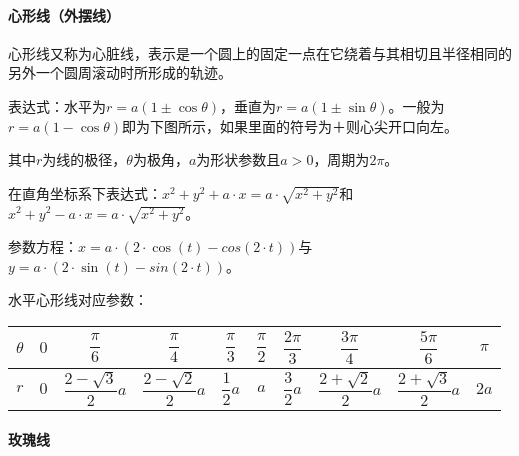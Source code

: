 \documentclass[UTF8, 12pt]{ctexart}
\begin{document}
\paragraph{心形线（外摆线）} \leavevmode \medskip

\begin{minipage}{0.55\linewidth}
    心形线又称为心脏线，表示是一个圆上的固定一点在它绕着与其相切且半径相同的另外一个圆周滚动时所形成的轨迹。

    表达式：水平为$r=a(1\pm\cos\theta)$，垂直为$r=a(1\pm\sin\theta)$。一般为$r=a(1-\cos\theta)$即为下图所示，如果里面的符号为＋则心尖开口向左。

    其中$r$为线的极径，$\theta$为极角，$a$为形状参数且$a>0$，周期为$2\pi$。
\end{minipage}
\hfill
\begin{minipage}{0.35\linewidth}
\end{minipage}

在直角坐标系下表达式：$x^2+y^2+a\cdot x=a\cdot\sqrt{x^2+y^2}$和$x^2+y^2-a\cdot x=a\cdot\sqrt{x^2+y^2}$。

参数方程：$x=a\cdot(2\cdot\cos(t)-cos(2\cdot t))$与$y=a\cdot(2\cdot\sin(t)-sin(2\cdot t))$。

水平心形线对应参数： \leavevmode \medskip

\begin{tabular}{|c|c|c|c|c|c|c|c|c|c|}
    \hline
    $\theta$ & $0$ & $\dfrac{\pi}{6}$         & $\dfrac{\pi}{4}$         & $\dfrac{\pi}{3}$ & $\dfrac{\pi}{2}$ & $\dfrac{2\pi}{3}$ & $\dfrac{3\pi}{4}$        & $\dfrac{5\pi}{6}$        & $\pi$ \\ \hline
    $r$      & $0$ & $\dfrac{2-\sqrt{3}}{2}a$ & $\dfrac{2-\sqrt{2}}{2}a$ & $\dfrac{1}{2}a$  & $a$             & $\dfrac{3}{2}a$   & $\dfrac{2+\sqrt{2}}{2}a$ & $\dfrac{2+\sqrt{3}}{2}a$ & $2a$  \\
    \hline
\end{tabular}

\paragraph{玫瑰线} \leavevmode \medskip
\end{document}
